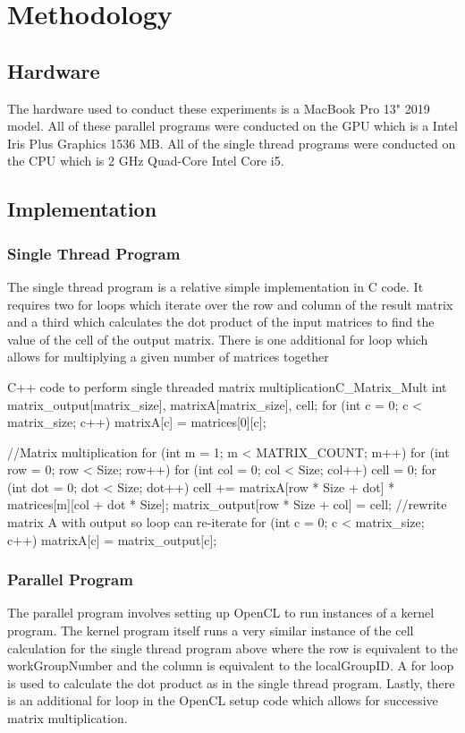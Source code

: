 \section{Methodology}

\subsection{Hardware}
The hardware used to conduct these experiments is a MacBook Pro 13" 2019 model.
All of these parallel programs were conducted on the GPU which is a Intel Iris Plus Graphics 1536 MB.
All of the single thread programs were conducted on the CPU which is 2 GHz Quad-Core Intel Core i5.

\subsection{Implementation}

\subsubsection{Single Thread Program}
The single thread program is a relative simple implementation in C code.
It requires two for loops which iterate over the row and column of the result matrix and a third which calculates the dot product of the input matrices to find the value of the cell of the output matrix.
There is one additional for loop which allows for multiplying a given number of matrices together

\begin{OpenCL}{C++ code to perform single threaded matrix multiplication}{C_Matrix_Mult}
 int matrix_output[matrix_size], matrixA[matrix_size], cell;
 for (int c = 0; c < matrix_size; c++) matrixA[c] = matrices[0][c];

 //Matrix multiplication
 for (int m = 1; m < MATRIX_COUNT; m++) {
  for (int row = 0; row < Size; row++) {
   for (int col = 0; col < Size; col++) {
    cell = 0;
    for (int dot = 0; dot < Size; dot++) {
     cell += matrixA[row * Size + dot] * matrices[m][col + dot * Size];
    }
    matrix_output[row * Size + col] = cell;
   }
  }
  //rewrite matrix A with output so loop can re-iterate
  for (int c = 0; c < matrix_size; c++) matrixA[c] = matrix_output[c];
 }
\end{OpenCL}

\subsubsection{Parallel Program}
The parallel program involves setting up OpenCL to run instances of a kernel program.
The kernel program itself runs a very similar instance of the cell calculation for the single thread program above where the row is equivalent to the workGroupNumber and the column is equivalent to the localGroupID.
A for loop is used to calculate the dot product as in the single thread program.
Lastly, there is an additional for loop in the OpenCL setup code which allows for successive matrix multiplication.


